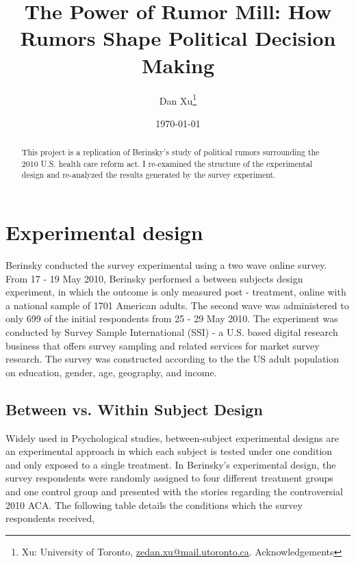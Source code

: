 \documentclass[AER]{AEA}
\begin{document}
\title{The Power of Rumor Mill: How Rumors Shape Political Decision
Making}


\author{
  Dan Xu\thanks{
  Xu: University of
Toronto, \href{mailto:zedan.xu@mail.utoronto.ca}{zedan.xu@mail.utoronto.ca}.
  Acknowledgements
}
}

\date{\today}

\begin{abstract}
This project is a replication of Berinsky's study of political rumors
surrounding the 2010 U.S. health care reform act. I re-examined the
structure of the experimental design and re-analyzed the results
generated by the survey experiment.
\end{abstract}


\maketitle

\section{Experimental design}

Berinsky conducted the survey experimental using a two wave online
survey. From 17 - 19 May 2010, Berinsky performed a between subjects
design experiment, in which the outcome is only measured post -
treatment, online with a national sample of 1701 American adults. The
second wave was administered to only 699 of the initial respondents from
25 - 29 May 2010. The experiment was conducted by Survey Sample
International (SSI) - a U.S. based digital research business that offers
survey sampling and related services for market survey research. The
survey was constructed according to the the US adult population on
education, gender, age, geography, and income.

\subsection{Between vs. Within Subject Design}

Widely used in Psychological studies, between-subject experimental
designs are an experimental approach in which each subject is tested
under one condition and only exposed to a single treatment. In
Berinsky's experimental design, the survey respondents were randomly
assigned to four different treatment groups and one control group and
presented with the stories regarding the controversial 2010 ACA. The
following table details the conditions which the survey respondents
received,
\end{document}
